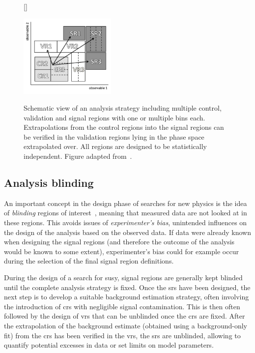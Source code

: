 \begin{figure}
[\FBwidth]
{\caption{Schematic view of an analysis strategy including multiple control, validation and signal regions with one or multiple bins each. Extrapolations from the control regions into the signal regions can be verified in the validation regions lying in the phase space extrapolated over. All regions are designed to be statistically independent. Figure adapted from~\cite{HistFitter:2014wma}.}\label{fig:hf_strategy}}
{\includegraphics[width=0.42\textwidth]{hf_strategy}}
\end{figure}

\subsection{Analysis blinding}

An important concept in the design phase of searches for new physics is the idea of \textit{blinding} regions of interest~\cite{blind:2003rw}, meaning that measured data are not looked at in these regions.
This avoids issues of \textit{experimenter's bias}, \ie unintended influences on the design of the analysis based on the observed data.
If data were already known when designing the signal regions (and therefore the outcome of the analysis would be known to some extent), experimenter's bias could for example occur during the selection of the final signal region definitions.

During the design of a search for \gls{susy}, signal regions are generally kept blinded until the complete analysis strategy is fixed.
Once the \glspl{sr} have been designed, the next step is to develop a suitable background estimation strategy, often involving the introduction of \glspl{cr} with negligible signal contamination.
This is then often followed by the design of \glspl{vr} that can be unblinded once the \glspl{cr} are fixed.
After the extrapolation of the background estimate (obtained using a background-only fit) from the \glspl{cr} has been verified in the \glspl{vr}, the \glspl{sr} are unblinded, allowing to quantify potential excesses in data or set limits on model parameters.

